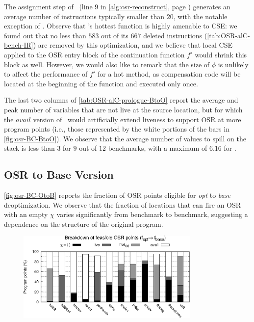 The assignment step of \reconstruct\ (line 9 in \myalgorithm\ref{alg:osr-reconstruct}, page \pageref{alg:osr-reconstruct}) generates an average number of instructions typically smaller than $20$, with the notable exception of . Observe that 's hottest function  is highly amenable to CSE: we found out that no less than $583$ out of its $667$ deleted instructions (\mytable\ref{tab:OSR-alC-bench-IR}) are removed by this optimization, and we believe that local CSE applied to the OSR entry block of the continuation function $f'$ would shrink this block as well. However, we would also like to remark that the size of $\phi$ is unlikely to affect the performance of $f'$ for a hot method, as compensation code will be located at the beginning of the function and executed only once.

The last two columns of \mytable\ref{tab:OSR-alC-prologue-BtoO} report the average and peak number of variables that are not live at the source location, but for which the $avail$ version of \reconstruct\ would artificially extend liveness to support OSR at more program points (i.e., those represented by the white portions of the bars in \myfigure\ref{fig:osr-BC-BtoO}). We observe that the average number of values to spill on the stack is less than $3$ for $9$ out of $12$ benchmarks, with a maximum of $6.16$ for .

\subsection{OSR to Base Version}

\myfigure\ref{fig:osr-BC-OtoB} reports the fraction of OSR points eligible for {\em opt} to {\em base} deoptimization. We observe that the fraction of locations that can fire an OSR with an empty $\chi$ varies significantly from benchmark to benchmark, suggesting a dependence on the structure of the original program.

\begin{figure}[!t]
\begin{center}
\includegraphics[width=0.8\textwidth]{figures/osr-BC-OtoB/osr-BC-OtoB.eps}
\caption{\protect}
\end{center}
\end{figure}

